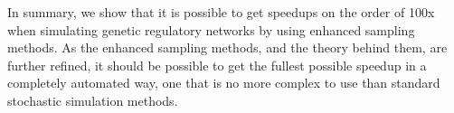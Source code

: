 In summary, we show that it is possible to get speedups on the order of 100x when simulating genetic regulatory networks by using enhanced sampling methods. As the enhanced sampling methods, and the theory behind them, are further refined, it should be possible to get the fullest possible speedup in a completely automated way, one that is no more complex to use than standard stochastic simulation methods.